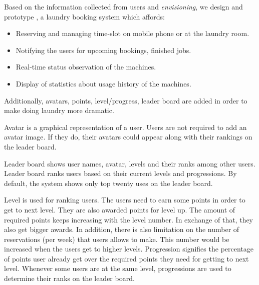 Based on the information collected from users and \emph{envisioning}, we design and prototype {\toolname}, a laundry booking system which affords:
\begin{itemize}
\item Reserving and managing time-slot on mobile phone or at the laundry room.
\item Notifying the users for upcoming bookings, finished jobs.
\item Real-time status observation of the machines.
\item Display of statistics about usage history of the machines.
\end{itemize}
Additionally, avatars, points, level/progress, leader board are added in order to make doing laundry more dramatic.

Avatar is a graphical representation of a user. Users are not required to add an avatar image. If they do, their avatars could appear along with their rankings on the leader board. 

Leader board shows user names, avatar, levels and their ranks among other users. Leader board ranks users based on their current levels and progressions. By default, the system shows only top twenty uses on the leader board.

Level is used for ranking users. The users need to earn some points in order to get to next level. They are also awarded points for level up. The amount of required points keeps increasing with the level number. In exchange of that, they also get bigger awards. In addition, there is also limitation on the number of reservations (per week) that users allows to make. This number would be increased when the users get to higher levels. Progression signifies the percentage of points user already get over the required points they need for getting to next level. Whenever some users are at the same level, progressions are used to determine their ranks on the leader board.
 
